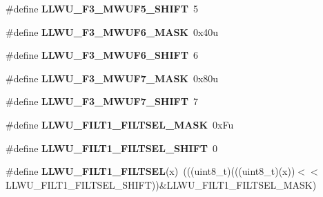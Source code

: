 \begin{DoxyCompactItemize}
\item 
\#define {\bfseries L\+L\+W\+U\+\_\+\+F3\+\_\+\+M\+W\+U\+F5\+\_\+\+S\+H\+I\+FT}~5\hypertarget{group__LLWU__Register__Masks_gac8a9d2de72a5034fae66714d25aa5f33}{}\label{group__LLWU__Register__Masks_gac8a9d2de72a5034fae66714d25aa5f33}

\item 
\#define {\bfseries L\+L\+W\+U\+\_\+\+F3\+\_\+\+M\+W\+U\+F6\+\_\+\+M\+A\+SK}~0x40u\hypertarget{group__LLWU__Register__Masks_gabd1f915448c7918a8aabc74239d7e773}{}\label{group__LLWU__Register__Masks_gabd1f915448c7918a8aabc74239d7e773}

\item 
\#define {\bfseries L\+L\+W\+U\+\_\+\+F3\+\_\+\+M\+W\+U\+F6\+\_\+\+S\+H\+I\+FT}~6\hypertarget{group__LLWU__Register__Masks_gaab649d98d5d8eb9f2f272649ace225c4}{}\label{group__LLWU__Register__Masks_gaab649d98d5d8eb9f2f272649ace225c4}

\item 
\#define {\bfseries L\+L\+W\+U\+\_\+\+F3\+\_\+\+M\+W\+U\+F7\+\_\+\+M\+A\+SK}~0x80u\hypertarget{group__LLWU__Register__Masks_ga2ddb11dc5e9f8a8404ccf99f10046b5a}{}\label{group__LLWU__Register__Masks_ga2ddb11dc5e9f8a8404ccf99f10046b5a}

\item 
\#define {\bfseries L\+L\+W\+U\+\_\+\+F3\+\_\+\+M\+W\+U\+F7\+\_\+\+S\+H\+I\+FT}~7\hypertarget{group__LLWU__Register__Masks_gaee31def5b074844cbf46f9d7e54d2d4f}{}\label{group__LLWU__Register__Masks_gaee31def5b074844cbf46f9d7e54d2d4f}

\item 
\#define {\bfseries L\+L\+W\+U\+\_\+\+F\+I\+L\+T1\+\_\+\+F\+I\+L\+T\+S\+E\+L\+\_\+\+M\+A\+SK}~0x\+Fu\hypertarget{group__LLWU__Register__Masks_gaa44e21d07f509d1f5d6cec9da32ab8ab}{}\label{group__LLWU__Register__Masks_gaa44e21d07f509d1f5d6cec9da32ab8ab}

\item 
\#define {\bfseries L\+L\+W\+U\+\_\+\+F\+I\+L\+T1\+\_\+\+F\+I\+L\+T\+S\+E\+L\+\_\+\+S\+H\+I\+FT}~0\hypertarget{group__LLWU__Register__Masks_gaab2a7991b2b135f0557b1b41cc3528f7}{}\label{group__LLWU__Register__Masks_gaab2a7991b2b135f0557b1b41cc3528f7}

\item 
\#define {\bfseries L\+L\+W\+U\+\_\+\+F\+I\+L\+T1\+\_\+\+F\+I\+L\+T\+S\+EL}(x)~(((uint8\+\_\+t)(((uint8\+\_\+t)(x))$<$$<$L\+L\+W\+U\+\_\+\+F\+I\+L\+T1\+\_\+\+F\+I\+L\+T\+S\+E\+L\+\_\+\+S\+H\+I\+FT))\&L\+L\+W\+U\+\_\+\+F\+I\+L\+T1\+\_\+\+F\+I\+L\+T\+S\+E\+L\+\_\+\+M\+A\+SK)\hypertarget{group__LLWU__Register__Masks_ga9d7876a517542c2fa363b9f15d375d69}{}\label{group__LLWU__Register__Masks_ga9d7876a517542c2fa363b9f15d375d69}


\end{DoxyCompactItemize}
